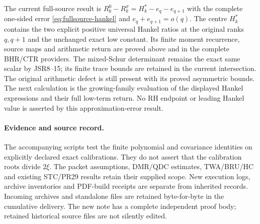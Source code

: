 \documentclass[11pt,a4paper]{article}
\begin{document}
The current full-source result is
$R_k^0-R_k^\sigma=H_k^*-e_q-e_{q+1}$ with the complete
one-sided error \eqref{eq:fullsource-hankel} and
$e_q+e_{q+1}=o(q)$. The centre $H_k^*$ contains the two
explicit positive universal Hankel ratios at the original
ranks $q,q+1$ and the unchanged exact low constant.
Its finite moment recurrence, source maps and arithmetic
return are proved above and in the complete BHR/CTR providers.
The mixed-Schur determinant remains the exact same scalar
by JSR8--15; its finite trace bounds are retained in the
current intersection. The original arithmetic defect
is still present with its proved asymmetric bounds.
The next calculation is the growing-family evaluation of
the displayed Hankel expressions and their full low-term
return. No RH endpoint or leading Hankel value is asserted
by this approximation-error result.

\paragraph{Evidence and source record.}
The accompanying scripts test the finite polynomial and covariance identities on explicitly declared exact calibrations. They do not assert that the calibration roots divide $2\xi$. The packet assumptions, DMR/QDC estimates, TWA/BRU/HC and existing STC/PR29 results retain their supplied scope. New execution logs, archive inventories and PDF-build receipts are separate from inherited records. Incoming archives and standalone files are retained byte-for-byte in the cumulative delivery. The new note has a complete independent proof body; retained historical source files are not silently edited.
\end{document}

